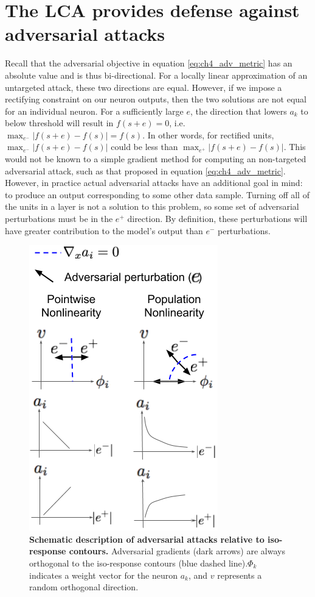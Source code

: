 \section{The LCA provides defense against adversarial attacks}
Recall that the adversarial objective in equation \eqref{eq:ch4_adv_metric} has an absolute value and is thus bi-directional. For a locally linear approximation of an untargeted attack, these two directions are equal. However, if we impose a rectifying constraint on our neuron outputs, then the two solutions are not equal for an individual neuron. For a sufficiently large $e$, the direction that lowers $a_{k}$ to below threshold will result in $f(s+e)=0$, i.e. $\max_{e^{-}}|f(s+e)-f(s)| = f(s)$. In other words, for rectified units, $\max_{e^{-}}|f(s+e)-f(s)|$ could be less than $\max_{e^{+}}|f(s+e)-f(s)|$. This would not be known to a simple gradient method for computing an non-targeted adversarial attack, such as that proposed in equation \eqref{eq:ch4_adv_metric}. However, in practice actual adversarial attacks have an additional goal in mind: to produce an output corresponding to some other data sample. Turning off all of the units in a layer is not a solution to this problem, so some set of adversarial perturbations must be in the $e^{+}$ direction. By definition, these perturbations will have greater contribution to the model's output than $e^{-}$ perturbations.

\begin{figure}
    \begin{center}
    \centerline{\includegraphics[width=0.5\columnwidth]{figures/adversarial_gradients_iso_contours.png}}
    \end{center}
    \caption{\textbf{Schematic description of adversarial attacks relative to iso-response contours.} Adversarial gradients (dark arrows) are always orthogonal to the iso-response contours (blue dashed line).$\Phi_{k}$ indicates a weight vector for the neuron $a_{k}$, and $v$ represents a random orthogonal direction.}
    \label{fig:ch4_adv_grads}
\end{figure}

